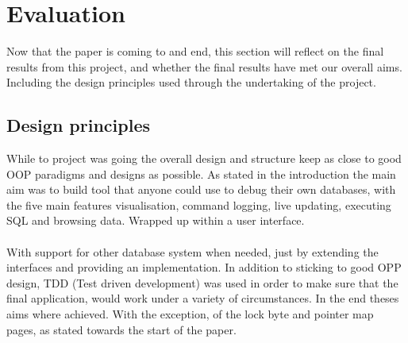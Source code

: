 %
%
%
%
%
%

\section{Evaluation}
\label{sec:evaluation}

Now that the paper is coming to and end, this section will reflect on the final results from this project, and whether the final results have met our overall aims. Including the design principles used through the undertaking of the project.

\subsection{Design principles}
\label{subsec:design_principles}

While to project was going the overall design and structure keep as close to good OOP paradigms and designs as possible. As stated in the introduction the main aim was to build tool that anyone could use to debug their own databases, with the five main features visualisation, command logging, live updating, executing SQL and browsing data. Wrapped up within a user interface. 
\\\\
With support for other database system when needed, just by extending the interfaces and providing an implementation. In addition to sticking to good OPP design, TDD (Test driven development) was used in order to make sure that the final application, would work under a variety of circumstances. In the end theses aims where achieved. With the exception, of the lock byte and pointer map pages, as stated towards the start of the paper. 


